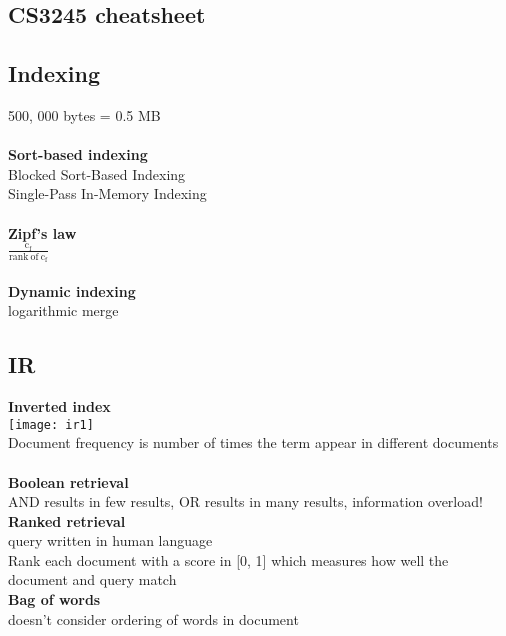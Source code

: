 \documentclass[11pt]{article}
\begin{document}
\setlength{\columnsep}{1cm}
\begin{multicols*}{3}
\section*{CS3245 cheatsheet}
\subsection*{Indexing}
500, 000 bytes = 0.5 MB\\\\
\textbf{Sort-based indexing}\\
Blocked Sort-Based Indexing\\
Single-Pass In-Memory Indexing\\
\\
\textbf{Zipf's law}\\
$\mathrm{\frac{c_{f}}{ rank\ of\ c_{f}}}$\\\\
\textbf{Dynamic indexing}\\
logarithmic merge
\subsection*{IR}
\textbf{Inverted index}\\
\texttt{[image: ir1]}\\
Document frequency is number of times the term appear in different documents
\\
\\
\textbf{Boolean retrieval}\\
AND results in few results, OR results in many results, information overload!
\\
\textbf{Ranked retrieval}\\
query written in human language
\\
Rank each document with a score in [0, 1] which measures how well the document and query match
\\
\textbf{Bag of words}\\
doesn't consider ordering of words in document


\end{multicols*}
\end{document}
